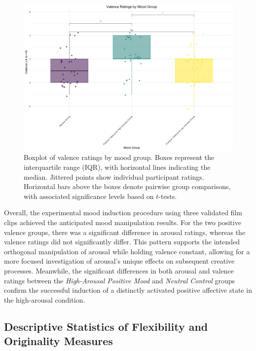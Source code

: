\documentclass[../MA_Thesis.tex]{subfiles}
\begin{document}
\begin{figure}[H]
  \centering
  \includegraphics[width=\textwidth]{../analysis/results/main_results/mood_induction_check/valence_by_group.png}
  \caption{
    Boxplot of valence ratings by mood group. Boxes represent the interquartile range (IQR), with horizontal lines indicating the median. Jittered points show individual participant ratings. Horizontal bars above the boxes denote pairwise group comparisons, with associated significance levels based on $t$-tests.
  }
  \label{fig:valence_group}
\end{figure}

Overall, the experimental mood induction procedure using three validated film clips achieved the anticipated mood manipulation results. For the two positive valence groups, there was a significant difference in arousal ratings, whereas the valence ratings did not significantly differ. This pattern supports the intended orthogonal manipulation of arousal while holding valence constant, allowing for a more focused investigation of arousal's unique effects on subsequent creative processes. Meanwhile, the significant differences in both arousal and valence ratings between the \textit{High-Arousal Positive Mood} and \textit{Neutral Control} groups confirm the successful induction of a distinctly activated positive affective state in the high-arousal condition.

\subsection*{Descriptive Statistics of Flexibility and Originality Measures}
\end{document}
